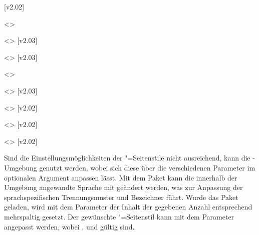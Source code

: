 \begin{DeclareEntity*}{}
\begin{DeclareEntity*}{}
\begin{DeclareEntity*}{}
\begin{Declaration}
  {}
\begin{Declaration}
  {}
\begin{Declaration}
  {}
\begin{Declaration}
  {}
  [v2.02]
\begin{Declaration}
  {}
  <>
\begin{Declaration}
  {}
  <>
  [v2.03]
\begin{Declaration}
  {}
  <>
  [v2.03]
\begin{Declaration}
  {}
  <>
\begin{Declaration}
  {}
  <>
  [v2.03]
\begin{Declaration}
  {}
  <>
  [v2.02]
\begin{Declaration}
  {}
  <>
  [v2.02]
\begin{Declaration}
  {}
  <>
  [v2.02]

Sind die Einstellungsmöglichkeiten der "=Seitenstile 
nicht ausreichend, kann die -Umgebung genutzt werden, 
wobei sich diese über die verschiedenen Parameter im optionalen Argument 
anpassen lässt. Mit dem Paket  kann die innerhalb der Umgebung 
angewandte Sprache mit 
geändert werden, was zur Anpassung der sprachspezifischen Trennungsmuster und 
Bezeichner führt. Wurde das Paket  geladen, wird mit dem 
Parameter  der Inhalt der 
gegebenen Anzahl entsprechend mehrspaltig gesetzt. Der gewünschte  
"=Seitenstil kann mit dem Parameter 
 angepasst werden, 
wobei ,  und  gültig sind. 


\end{Declaration}
\end{Declaration}
\end{Declaration}
\end{Declaration}
\end{Declaration}
\end{Declaration}
\end{Declaration}
\end{Declaration}
\end{Declaration}
\end{Declaration}
\end{Declaration}
\end{Declaration}
\end{DeclareEntity*}
\end{DeclareEntity*}
\end{DeclareEntity*}
